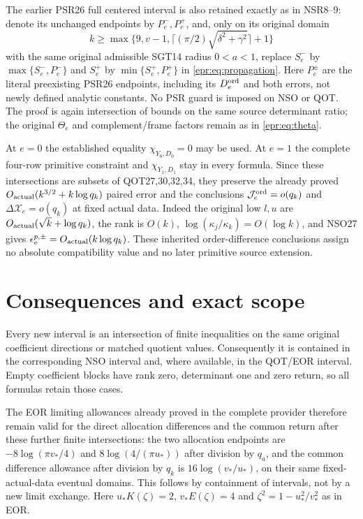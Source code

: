 \documentclass[11pt,a4paper]{article}
\begin{document}
The earlier PSR26 full centered interval is also retained exactly as in
NSR8--9: denote its unchanged endpoints by $P_e^-,P_e^+$, and, only
on its original domain
\[
 k\ge\max\{9,v-1,\lceil(\pi/2)\sqrt{\delta^2+\gamma^2}\rceil+1\}
\]
with the same original admissible SGT14 radius $0<a<1$, replace
$S_e^-$ by $\max\{S_e^-,P_e^-\}$ and $S_e^+$ by
$\min\{S_e^+,P_e^+\}$ in \eqref{epr:eq:propagation}.
Here $P_e^\pm$ are the literal preexisting PSR26 endpoints, including
its $D_e^{\rm ord}$ and both errors, not newly defined analytic constants.
No PSR guard is imposed on NSO or QOT. The proof is again intersection
of bounds on the same source determinant ratio; the original
$\Theta_e$ and complement/frame factors remain as in
\eqref{epr:eq:theta}.

At $e=0$ the established equality $\chi_{Y_0,D_0}=0$ may be used.
At $e=1$ the complete four-row primitive constraint and
$\chi_{Y_1,D_1}$ stay in every formula.
Since these intersections are subsets of QOT27,30,32,34, they preserve
the already proved $O_{\rm actual}(k^{3/2}+k\log q_k)$ paired error and
the conclusions $\mathcal J_e^{\rm ord}=o(q_k)$ and
$\Delta\mathcal X_e=o(q_k)$ at fixed actual data. Indeed the original
low $l,u$ are $O_{\rm actual}(\sqrt{k}+\log q_k)$, the rank is $O(k)$,
$\log(\kappa_j/\kappa_k)=O(\log k)$, and NSO27 gives
$\epsilon_e^{p,\pm}=O_{\rm actual}(k\log q_k)$.
These inherited order-difference conclusions assign no absolute
compatibility value and no later primitive source extension.

\section{Consequences and exact scope}
Every new interval is an intersection of finite inequalities on the
same original coefficient directions or matched quotient values.
Consequently it is contained in the corresponding NSO interval
and, where available, in the QOT/EOR interval. Empty coefficient
blocks have rank zero, determinant one and zero return, so all
formulas retain those cases.

The EOR limiting allowances already proved in the complete provider
therefore remain valid for the direct allocation differences and
the common return after these further finite intersections:
the two allocation endpoints are
$-8\log(\pi v_*/4)$ and $8\log(4/(\pi u_*))$ after division by
$q_a$, and the common difference allowance after division by
$q_k$ is $16\log(v_*/u_*)$, on their same fixed-actual-data eventual
domains. This follows by containment of intervals, not by a new
limit exchange. Here $u_*K(\zeta)=2$, $v_*E(\zeta)=4$ and
$\zeta^2=1-u_*^2/v_*^2$ as in EOR.
\end{document}
